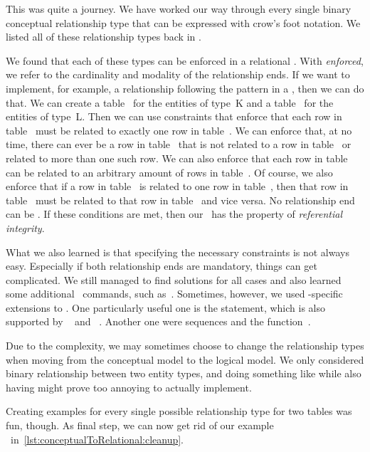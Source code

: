 %
%
%
%
%
This was quite a journey.
We have worked our way through every single binary conceptual relationship type that can be expressed with crow's foot notation.
We listed all of these relationship types back in .

We found that each of these types can be enforced in a relational \dbms.
With \emph{enforced}, we refer to the cardinality and modality of the relationship ends.
If we want to implement, for example, a relationship following the pattern  in a \dbms, then we can do that.
We can create a table~ for the entities of type~K and a table~ for the entities of type~L.
Then we can use constraints that enforce that each row in table~ must be related to exactly one row in table~.
We can enforce that, at no time, there can ever be a row in table~ that is not related to a row in table~ or related to more than one such row.
We can also enforce that each row in table~ can be related to an arbitrary amount of rows in table~.
Of course, we also enforce that if a row in table~ is related to one row in table~, then that row in table~ must be related to that row in table~ and vice versa.
No relationship end can be .
If these conditions are met, then our \db\ has the property of \emph{referential integrity}.

What we also learned is that specifying the necessary constraints is not always easy.
Especially if both relationship ends are mandatory, things can get complicated.
We still managed to find solutions for all cases and also learned some additional \sql\ commands, such as~.
Sometimes, however, we used \postgresql-specific extensions to \sql.
One particularly useful one is the  statement, which is also supported by \mariadb~\cite{M:MSD:IR} and \sqlite~\cite{HWACIS:R}.
Another one were sequences and the  function~\cite{PGDG:PD:CS,PGDG:PD:SMF}.

Due to the complexity, we may sometimes choose to change the relationship types when moving from the conceptual model to the logical model.
We only considered binary relationship between two entity types, and doing something like  while also having  might prove too annoying to actually implement.

Creating examples for every single possible relationship type for two tables was fun, though.
As final step, we can now get rid of our example \db\ in~\cref{lst:conceptualToRelational:cleanup}.%
%
\endhsection%
